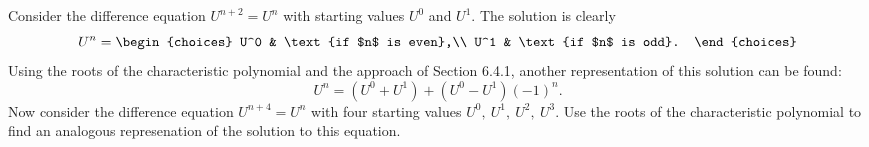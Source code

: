 

Consider the difference equation $U^{n+2} = U^n$ with starting values $U^0$
and $U^1$.  The solution is clearly
\[
U^n = \begin{choices} U^0  & \text{if $n$ is even},\\
               U^1  & \text{if $n$ is odd}.
\end{choices}
\]
Using the roots of the characteristic polynomial and the approach of Section
6.4.1, another representation of this solution can be found:
\[
U^n = (U^0 + U^1) + (U^0 - U^1)(-1)^n.
\]
Now consider the difference equation $U^{n+4}=U^n$ with four starting values
$U^0,~U^1,~U^2,~U^3$.  Use the roots of the characteristic polynomial to
find an analogous represenation of the solution to this equation.

